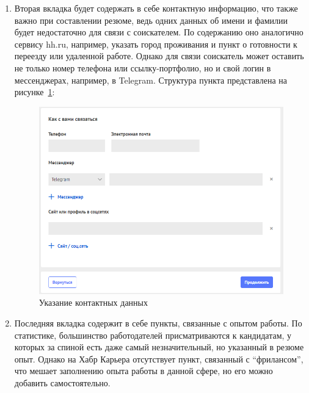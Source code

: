 \documentclass[master, och, pract]{SCWorks}
\begin{document}
\begin{enumerate}
    \item Вторая вкладка будет содержать в себе контактную информацию, что также важно 
    при составлении резюме, ведь одних данных об имени и фамилии будет недостаточно 
    для связи с соискателем. По содержанию оно аналогично сервису hh.ru, например, 
    указать город проживания и пункт о готовности к переезду или удаленной работе. 
    Однако для связи соискатель может оставить не только номер телефона или 
    ссылку-портфолио, но и свой логин в мессенджерах, например, в Telegram.
    Структура пункта представлена на рисунке~\ref{fig:9}:
    \begin{figure}[!ht]
        \centering
        \includegraphics[width=12cm]{images/image2.png}
        \caption{\label{fig:9}%
            Указание контактных данных}
    \end{figure}

    \item Последняя вкладка содержит в себе пункты, связанные с опытом работы. 
    По статистике, большинство работодателей присматриваются к кандидатам, 
    у которых за спиной есть даже самый незначительный, но указанный в резюме опыт. 
    Однако на Хабр Карьера отсутствует пункт, связанный с “фрилансом”, что мешает 
    заполнению опыта работы в данной сфере, но его можно добавить самостоятельно.
\end{enumerate}
\end{document}
